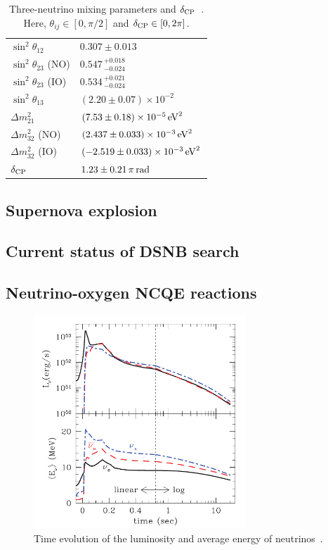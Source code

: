 \begin{table}[h]
	\caption[Three-neutrino mixing parameters and $\delta_{{\rm CP}}$]{\label{Introd_Tab:Neu} Three-neutrino mixing parameters and $\delta_{{\rm CP}}$~\cite{PDG}. Here, $\theta_{ij}\in[0,\pi/2]$ and $\delta_{{\rm CP}}\in[0,2\pi]$.}
	\centering
	\vs
	\begin{tabular}{ll}
		\hline\hline
		$\sin^{2}\theta_{12}$&$0.307 \pm 0.013$\\
		$\sin^{2}\theta_{23}$ (NO)&$0.547\,^{+0.018}_{-0.024}$\\
		$\sin^{2}\theta_{23}$ (IO)&$0.534\,^{+0.021}_{-0.024}$\\
		$\sin^{2}\theta_{13}$&$(2.20 \pm 0.07) \times 10^{-2}$\\
		$\Delta m_{21}^{2}$&$(7.53 \pm 0.18) \times 10^{-5}\,{\rm eV}^{2}$\\
		$\Delta m_{32}^{2}$ (NO)&$(2.437 \pm 0.033) \times 10^{-3}\,{\rm eV}^{2}$\\
		$\Delta m_{32}^{2}$ (IO)&$(-2.519 \pm 0.033) \times 10^{-3}\,{\rm eV}^{2}$\\
		$\delta_{{\rm CP}}$&$1.23 \pm 0.21\,\pi\,{\rm rad}$\\
		\hline\hline
	\end{tabular}
\end{table}

\subsection{Supernova explosion}

\subsection{Current status of DSNB search}

\subsection{Neutrino-oxygen NCQE reactions}

\begin{figure}[tbp]
	\centering
	\includegraphics[width=8cm]{Figures/Introduction/TimeLE}
	\caption[Time evolution of the luminosity and average energy of neutrinos]{\label{Introd_TimeLE} Time evolution of the luminosity and average energy of neutrinos~\cite{2013Nakazato}.}
\end{figure}

